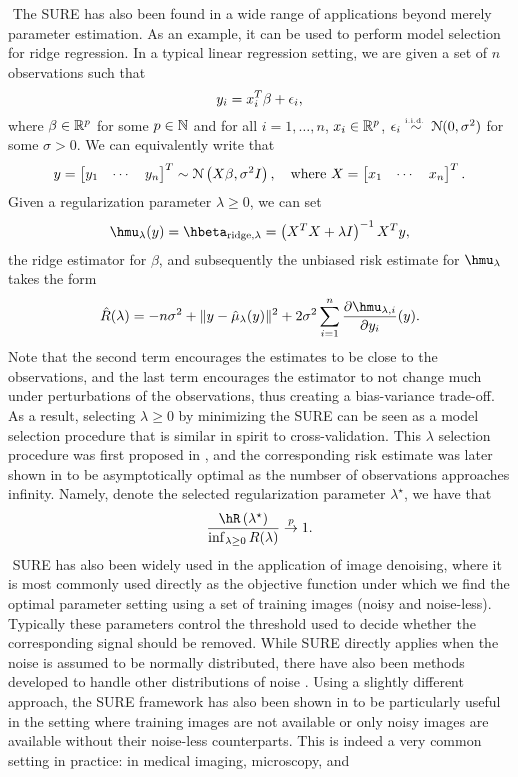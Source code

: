 $ $\newline
The SURE has also been found in a wide range of applications beyond merely parameter estimation. As an example, it can be used to perform model selection for ridge regression. In a typical linear regression setting, we are given a set of $n$ observations such that
\[
y_i = x_i^T\beta + \epsilon_i,
\]
where $\beta\in\mathbb{R}^p$ for some $p\in\mathbb{N}$ and for all $i=1,\dots,n$, $x_i\in\mathbb{R}^p$, $\epsilon_i\overset{\textrm{\tiny i.i.d.\ }}{\sim} \mathcal{N}(0,\sigma^2)$ for some $\sigma>0$. We can equivalently write that
\[
y = \begin{bmatrix} y_1 & \cdots & y_n \end{bmatrix}^T \sim \mathcal{N}\left(X\beta, \sigma^2I \right), \quad \text{where } X = \begin{bmatrix} x_1 & \cdots & x_n \end{bmatrix}^T.
\]
Given a regularization parameter $\lambda\geq0$, we can set
\[
\hmu_\lambda(y) = \hbeta_{\text{ridge}, \lambda} = \left( X^TX + \lambda I \right)^{-1}X^Ty,
\]
the ridge estimator for $\beta$, and subsequently the unbiased risk estimate for $\hmu_\lambda$ takes the form
\[
\hat{R}(\lambda) = -n\sigma^2 + \| y - \hat{\mu}_\lambda(y) \|^2 + 2\sigma^2\sum_{i=1}^n \frac{\partial \hmu_{\lambda,i}}{\partial y_i}(y).
\]
Note that the second term encourages the estimates to be close to the observations, and the last term encourages the estimator to not change much under perturbations of the observations, thus creating a bias-variance trade-off. As a result, selecting $\lambda\geq0$ by minimizing the SURE can be seen as a model selection procedure that is similar in spirit to cross-validation. This $\lambda$ selection procedure was first proposed in \citet{10.2307/1267380}, and the corresponding risk estimate was later shown in \citet{li1986asymptotic} to be asymptotically optimal as the numbser of observations approaches infinity. Namely, denote the selected regularization parameter $\lambda^\star$, we have that
\[
\frac{\hR\left(\lambda^\star\right)}{\inf_{\lambda\geq0}R(\lambda)} \convp 1.
\]
$ $\newline
SURE has also been widely used in the application of image denoising, where it is most commonly used directly as the objective function under which we find the optimal parameter setting using a set of training images (noisy and noise-less). Typically these parameters control the threshold used to decide whether the corresponding signal should be removed. While SURE directly applies when the noise is assumed to be normally distributed, there have also been methods developed to handle other distributions of noise \citep{donoho1995adapting,luisier2010image,panisetti2014unbiased}. Using a slightly different approach, the SURE framework has also been shown in \citet{metzler2018unsupervised} to be particularly useful in the setting where training images are not available or only noisy images are available without their noise-less counterparts. This is indeed a very common setting in practice: in medical imaging, microscopy, and
